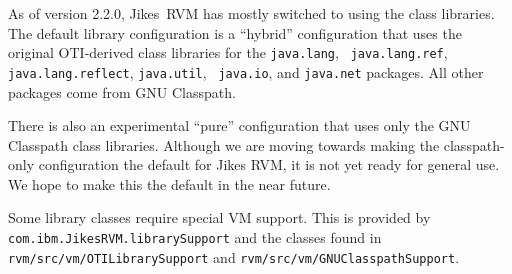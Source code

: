 As of version 2.2.0, Jikes\JikesTMFootnote\ RVM has mostly switched to
using the  class libraries.  The
default library configuration is a ``hybrid'' configuration that uses
the original OTI-derived class libraries for the {\tt java.lang}, {\tt
java.lang.ref}, {\tt java.lang.reflect}, {\tt java.util}, {\tt
java.io}, and {\tt java.net} packages.  All other packages come from
GNU Classpath.

There is also an experimental ``pure'' configuration that uses only
the GNU Classpath class libraries. Although we are moving towards
making the classpath-only configuration the default for Jikes RVM, it
is not yet ready for general use. We hope to make this the default in
the near future.

Some library classes require special VM support.  This is provided by
{\tt com.ibm.JikesRVM.librarySupport} and the classes found in
{\tt rvm/src/vm/OTILibrarySupport} and {\tt rvm/src/vm/GNUClasspathSupport}. 

\JikesTMFooter
